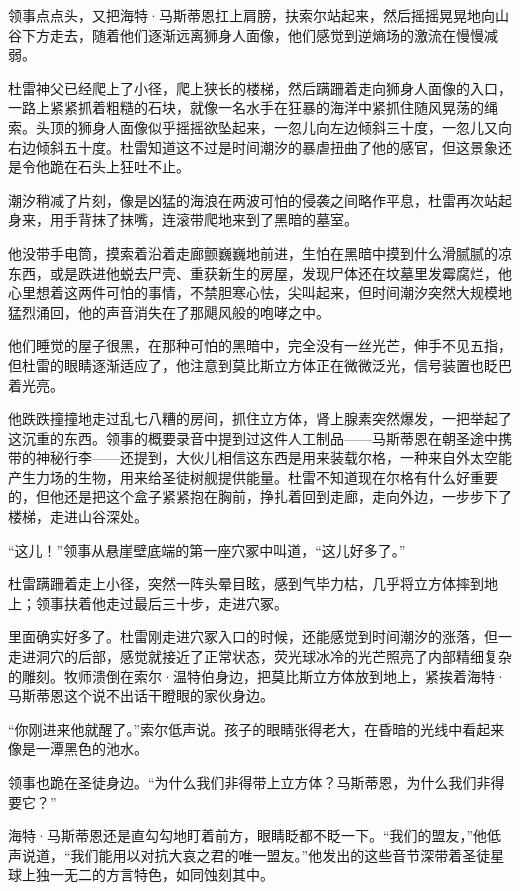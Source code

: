 \documentclass[AutoFakeBold=true]{book}
\begin{document}
领事点点头，又把海特·马斯蒂恩扛上肩膀，扶索尔站起来，然后摇摇晃晃地向山谷下方走去，随着他们逐渐远离狮身人面像，他们感觉到逆熵场的激流在慢慢减弱。

杜雷神父已经爬上了小径，爬上狭长的楼梯，然后蹒跚着走向狮身人面像的入口，一路上紧紧抓着粗糙的石块，就像一名水手在狂暴的海洋中紧抓住随风晃荡的绳索。头顶的狮身人面像似乎摇摇欲坠起来，一忽儿向左边倾斜三十度，一忽儿又向右边倾斜五十度。杜雷知道这不过是时间潮汐的暴虐扭曲了他的感官，但这景象还是令他跪在石头上狂吐不止。

潮汐稍减了片刻，像是凶猛的海浪在两波可怕的侵袭之间略作平息，杜雷再次站起身来，用手背抹了抹嘴，连滚带爬地来到了黑暗的墓室。

他没带手电筒，摸索着沿着走廊颤巍巍地前进，生怕在黑暗中摸到什么滑腻腻的凉东西，或是跌进他蜕去尸壳、重获新生的房屋，发现尸体还在坟墓里发霉腐烂，他心里想着这两件可怕的事情，不禁胆寒心怯，尖叫起来，但时间潮汐突然大规模地猛烈涌回，他的声音消失在了那飓风般的咆哮之中。

他们睡觉的屋子很黑，在那种可怕的黑暗中，完全没有一丝光芒，伸手不见五指，但杜雷的眼睛逐渐适应了，他注意到莫比斯立方体正在微微泛光，信号装置也眨巴着光亮。

他跌跌撞撞地走过乱七八糟的房间，抓住立方体，肾上腺素突然爆发，一把举起了这沉重的东西。领事的概要录音中提到过这件人工制品——马斯蒂恩在朝圣途中携带的神秘行李——还提到，大伙儿相信这东西是用来装载尔格，一种来自外太空能产生力场的生物，用来给圣徒树舰提供能量。杜雷不知道现在尔格有什么好重要的，但他还是把这个盒子紧紧抱在胸前，挣扎着回到走廊，走向外边，一步步下了楼梯，走进山谷深处。

``这儿！''领事从悬崖壁底端的第一座穴冢中叫道，``这儿好多了。''

杜雷蹒跚着走上小径，突然一阵头晕目眩，感到气毕力枯，几乎将立方体摔到地上；领事扶着他走过最后三十步，走进穴冢。

里面确实好多了。杜雷刚走进穴冢入口的时候，还能感觉到时间潮汐的涨落，但一走进洞穴的后部，感觉就接近了正常状态，荧光球冰冷的光芒照亮了内部精细复杂的雕刻。牧师溃倒在索尔·温特伯身边，把莫比斯立方体放到地上，紧挨着海特·马斯蒂恩这个说不出话干瞪眼的家伙身边。

``你刚进来他就醒了。''索尔低声说。孩子的眼睛张得老大，在昏暗的光线中看起来像是一潭黑色的池水。

领事也跪在圣徒身边。``为什么我们非得带上立方体？马斯蒂恩，为什么我们非得要它？''

海特·马斯蒂恩还是直勾勾地盯着前方，眼睛眨都不眨一下。``我们的盟友，''他低声说道，``我们能用以对抗大哀之君的唯一盟友。''他发出的这些音节深带着圣徒星球上独一无二的方言特色，如同蚀刻其中。
\end{document}
